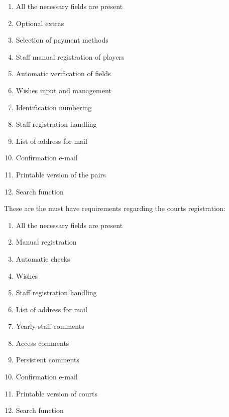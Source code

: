 \begin{enumerate} \itemsep1pt
\item \textcolor{green!60!black} {All the necessary fields are present}
\item \textcolor{green!60!black} {Optional extras}
\item \textcolor{green!60!black} {Selection of payment methods}
\item \textcolor{green!60!black} {Staff manual registration of players}
\item \textcolor{green!60!black} {Automatic verification of fields}
\item \textcolor{green!60!black} {Wishes input and management}
\item \textcolor{green!60!black} {Identification numbering}
\item \textcolor{green!60!black} {Staff registration handling}
\item \textcolor{green!60!black} {List of address for mail}
\item \textcolor{green!60!black} {Confirmation e-mail}
\item \textcolor{green!60!black} {Printable version of the pairs}
\item \textcolor{green!60!black} {Search function}
\end{enumerate}

These are the must have requirements regarding the courts registration:\newline

\begin{enumerate} \itemsep1pt
\item \textcolor{green!60!black} {All the necessary fields are present}
\item \textcolor{green!60!black} {Manual registration}
\item \textcolor{green!60!black} {Automatic checks}
\item \textcolor{green!60!black} {Wishes}
\item \textcolor{green!60!black} {Staff registration handling}
\item \textcolor{green!60!black} {List of address for mail}
\item \textcolor{green!60!black} {Yearly staff comments}
\item \textcolor{green!60!black} {Access comments}
\item \textcolor{green!60!black} {Persistent comments}
\item \textcolor{green!60!black} {Confirmation e-mail}
\item \textcolor{green!60!black} {Printable version of courts}
\item \textcolor{green!60!black} {Search function}
\end{enumerate}

